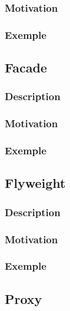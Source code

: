 \documentclass[french]{article}
\begin{document}
\subsubsection{Motivation}

\subsubsection{Exemple}



\subsection{Facade}

\subsubsection{Description}

\subsubsection{Motivation}

\subsubsection{Exemple}



\subsection{Flyweight}

\subsubsection{Description}

\subsubsection{Motivation}

\subsubsection{Exemple}



\subsection{Proxy}
\end{document}
